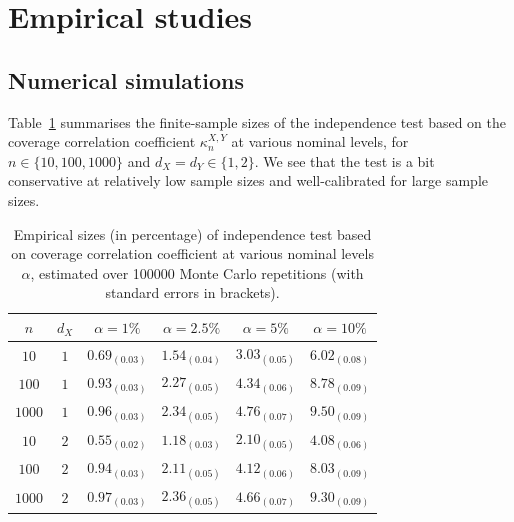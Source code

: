 \documentclass[11pt]{article}
\begin{document}
\section{Empirical studies}
\subsection{Numerical simulations}
\label{Sec:Numerics}
Table~\ref{Tab:Size} summarises the finite-sample sizes of the independence test based on the coverage correlation coefficient $\kappa_n^{X,Y}$ at various nominal levels, for $n \in\{10,100,1000\}$ and $d_X=d_Y\in\{1,2\}$. We see that the test is a bit conservative at relatively low sample sizes and well-calibrated for large sample sizes. 

\begin{table}
\centering
    \begin{tabular}{cccccc}
         $n$ & $d_X$ & $\alpha=1\%$ & $\alpha=2.5\%$ & $\alpha=5\%$ & $\alpha=10\%$\\
         \hline
$10$ & $1$ & $0.69_{(0.03)}$ & $1.54_{(0.04)}$ & $3.03_{(0.05)}$ & $6.02_{(0.08)}$\\
$100$ & $1$ & $0.93_{(0.03)}$ & $2.27_{(0.05)}$ & $4.34_{(0.06)}$ & $8.78_{(0.09)}$\\
$1000$ & $1$ & $0.96_{(0.03)}$ & $2.34_{(0.05)}$ & $4.76_{(0.07)}$ & $9.50_{(0.09)}$\\
$10$ & $2$ & $0.55_{(0.02)}$ & $1.18_{(0.03)}$ & $2.10_{(0.05)}$ & $4.08_{(0.06)}$\\
$100$ & $2$ & $0.94_{(0.03)}$ & $2.11_{(0.05)}$ & $4.12_{(0.06)}$ & $8.03_{(0.09)}$\\
$1000$ & $2$ & $0.97_{(0.03)}$ & $2.36_{(0.05)}$ & $4.66_{(0.07)}$ & $9.30_{(0.09)}$
    \end{tabular}
    \caption{\label{Tab:Size}Empirical sizes (in percentage) of independence test based on coverage correlation coefficient at various nominal levels $\alpha$, estimated over 100000 Monte Carlo repetitions (with standard errors in brackets). }
\end{table}
\end{document}
